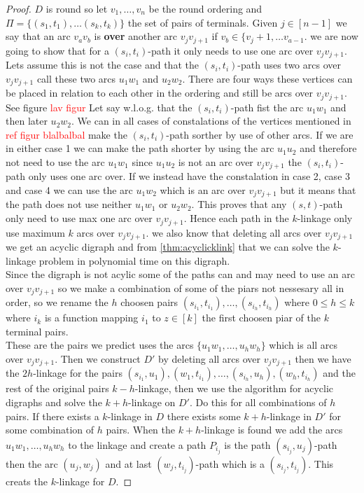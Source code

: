 \begin{proof}
    $D$ is round so let $v_1,\dots ,v_n$ be the round ordering and $\Pi = \lbrace (s_1,t_1), \dots (s_k,t_k)\rbrace$ the set of pairs of terminals.
    Given $j\in [n-1]$ we say that an arc $v_av_b$ is \textbf{over} another arc $v_jv_{j+1}$ if $v_b\in \lbrace v_j+1,\dots v_{a-1}$. 
    we are now going to show that for a $(s_i,t_i)$-path it only needs to use one arc over $v_jv_{j+1}$. 
    Lets assume this is not the case and that the $(s_i,t_i)$-path uses two arcs over $v_jv_{j+1}$ call these two arcs $u_1w_1$ and $u_2w_2$. 
    There are four ways these vertices can be placed in relation to each other in the ordering and still be arcs over $v_jv_{j+1}$. See figure \textcolor{red}{lav figur}
    Let say w.l.o.g. that the $(s_i,t_i)$-path fist the arc $u_1w_1$ and then later $u_2w_2$.
    We can in all cases of constalations of the vertices mentioned in \textcolor{red}{ref figur blalbalbal} make the $(s_i,t_i)$-path sorther by use of other arcs. 
    If we are in either case 1 we can make the path shorter by using the arc $u_1u_2$ and therefore not need to use the arc $u_1w_1$ since $u_1u_2$ is not an arc over $v_jv_{j+1}$ the $(s_i,t_i)$-path only uses one arc over.
    If we instead have the constalation in case 2, case 3 and case 4 we can use the arc $u_1w_2$ which is an arc over $v_jv_{j+1}$ but it means that the path does not use neither $u_1w_1$ or $u_2w_2$. 
    This proves that any $(s,t)$-path only need to use max one arc over $v_jv_{j+1}$.
    Hence each path in the $k$-linkage only use maximum $k$ arcs over $v_jv_{j+1}$.
    we also know that deleting all arcs over $v_jv_{j+1}$ we get an acyclic digraph and from \autoref{thm:acyclicklink} that we can solve the $k$-linkage problem in polynomial time on this digraph.\\
    Since the digraph is not acylic some of the paths can and may need to use an arc over $v_jv_{j+1}$ so we make a combination of some of the piars not nessesary all in order, so we rename the $h$ choosen pairs $(s_{i_1},t_{i_1}),\dots ,(s_{i_h},t_{i_h})$ where $0\leq h\leq k$ where $i_k$ is a function mapping $i_1$ to $z\in [k]$ the first choosen piar of the $k$ terminal pairs. \\
    These are the pairs we predict uses the arcs $\lbrace u_1w_1,\dots ,u_hw_h\rbrace$ which is all arcs over $v_jv_{j+1}$.
    Then we construct $D'$ by deleting all arcs over $v_jv_{j+1}$ then we have the $2h$-linkage for the pairs $(s_{i_1},u_1),(w_1,t_{i_1}),\dots ,(s_{i_h},u_h),(w_h,t_{i_h})$ and the rest of the original pairs $k-h$-linkage, then we use the algorithm for acyclic digraphs and solve the $k+h$-linkage on $D'$. Do this for all combinations of $h$ pairs. 
    If there exists a $k$-linkage in $D$ there exists some $k+h$-linkage in $D'$ for some combination of $h$ pairs.
    When the $k+h$-linkage is found we add the arcs $u_1w_1,\dots , u_hw_h$ to the linkage and create a path $P_{i_j}$ is the path $(s_{i_j},u_j)$-path then the arc $(u_j,w_j)$ and at last  $(w_j,t_{i_j})$-path which is a $(s_{i_j},t_{i_j})$.
    This creats the $k$-linkage for $D$. 
\end{proof}
